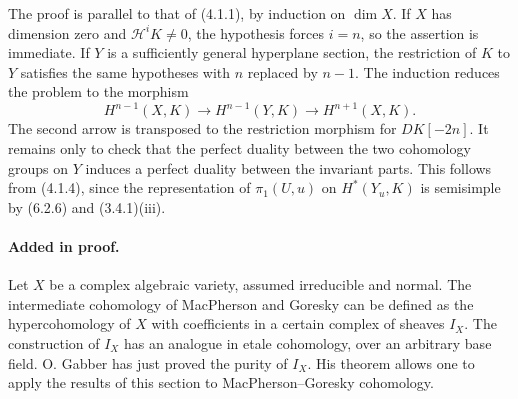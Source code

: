 \documentclass[11pt]{article}
\theoremstyle{remark}
\begin{document}
The proof is parallel to that of (4.1.1), by induction on \(\dim X\).  If \(X\) has dimension zero and \(\mathcal H^iK\ne0\), the hypothesis forces \(i=n\), so the assertion is immediate.  If \(Y\) is a sufficiently general hyperplane section, the restriction of \(K\) to \(Y\) satisfies the same hypotheses with \(n\) replaced by \(n-1\).  The induction reduces the problem to the morphism
\[
H^{n-1}(X,K)\longrightarrow H^{n-1}(Y,K)\longrightarrow H^{n+1}(X,K).
\]
The second arrow is transposed to the restriction morphism for \(DK[-2n]\).  It remains only to check that the perfect duality between the two cohomology groups on \(Y\) induces a perfect duality between the invariant parts.  This follows from (4.1.4), since the representation of \(\pi_1(U,u)\) on \(H^*(Y_u,K)\) is semisimple by (6.2.6) and (3.4.1)(iii).

\paragraph{Added in proof.}
Let \(X\) be a complex algebraic variety, assumed irreducible and normal.  The intermediate cohomology of MacPherson and Goresky can be defined as the hypercohomology of \(X\) with coefficients in a certain complex of sheaves \(I_X\).  The construction of \(I_X\) has an analogue in etale cohomology, over an arbitrary base field.  O. Gabber has just proved the purity of \(I_X\).  His theorem allows one to apply the results of this section to MacPherson--Goresky cohomology.
\end{document}
